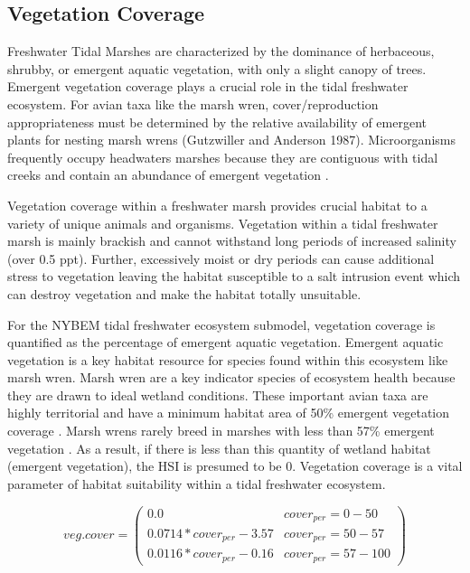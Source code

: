 \documentclass[
]{book}
\begin{document}
\hypertarget{vegetation-coverage}{%
\subsection{Vegetation Coverage}\label{vegetation-coverage}}

Freshwater Tidal Marshes are characterized by the dominance of herbaceous, shrubby, or emergent aquatic vegetation, with only a slight canopy of trees. Emergent vegetation coverage plays a crucial role in the tidal freshwater ecosystem. For avian taxa like the marsh wren, cover/reproduction appropriateness must be determined by the relative availability of emergent plants for nesting marsh wrens (Gutzwiller and Anderson 1987). Microorganisms frequently occupy headwaters marshes because they are contiguous with tidal creeks and contain an abundance of emergent vegetation \citep{rozas_rosubmerged_1988}.

Vegetation coverage within a freshwater marsh provides crucial habitat to a variety of unique animals and organisms. Vegetation within a tidal freshwater marsh is mainly brackish and cannot withstand long periods of increased salinity (over 0.5 ppt). Further, excessively moist or dry periods can cause additional stress to vegetation leaving the habitat susceptible to a salt intrusion event which can destroy vegetation and make the habitat totally unsuitable.

For the NYBEM tidal freshwater ecosystem submodel, vegetation coverage is quantified as the percentage of emergent aquatic vegetation. Emergent aquatic vegetation is a key habitat resource for species found within this ecosystem like marsh wren. Marsh wren are a key indicator species of ecosystem health because they are drawn to ideal wetland conditions. These important avian taxa are highly territorial and have a minimum habitat area of 50\% emergent vegetation coverage \citep{gutzwiller_habitat_1987}. Marsh wrens rarely breed in marshes with less than 57\% emergent vegetation \citep{gutzwiller_habitat_1987}. As a result, if there is less than this quantity of wetland habitat (emergent vegetation), the HSI is presumed to be 0. Vegetation coverage is a vital parameter of habitat suitability within a tidal freshwater ecosystem.

\[veg.cover = \begin{pmatrix} 0.0 & cover_{per}=0-50\\
0.0714*cover_{per}-3.57 & cover_{per}=50-57\\
0.0116*cover_{per}-0.16 & cover_{per}=57-100
\end{pmatrix}\]
\end{document}
